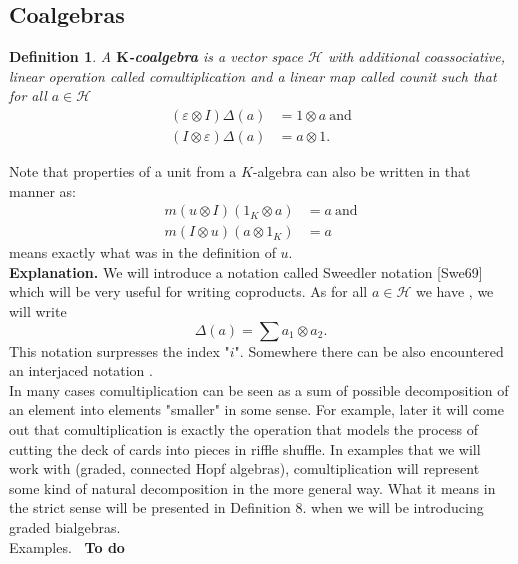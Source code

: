 \documentclass[a4paper, 12pt]{article}
\newtheorem{definition}{Definition}
\newcommand{\smalltodo}[1]{\textbf{\ To do}}
\begin{document}
\subsection{Coalgebras}
\begin{definition}
A \textbf{$\textbf{K}$-coalgebra} is a vector space $\mathcal{H}$
with additional coassociative, linear operation
 called comultiplication and
a linear map  called counit such that for all
$a \in \mathcal{H}$
\begin{align*}
(\varepsilon \otimes I)\Delta(a) &= 1 \otimes a \mathrm{\ and} \\
(I \otimes \varepsilon)\Delta(a) &= a \otimes 1.
\end{align*}
\end{definition}
Note that properties of a unit from a $K$-algebra can also be written in that manner as:
\begin{align*}
m(u \otimes I)(1_K \otimes a) &= a \mathrm{\ and}\\
m(I \otimes u)(a \otimes 1_K) &= a
\end{align*}
means exactly what was in the definition of $u$. \\[8pt]
\textbf{Explanation.} We will introduce a notation called Sweedler notation [Swe69] which will be
very useful
for writing coproducts. As for all $a \in \mathcal{H}$ we have
, we will write
\begin{equation*}
\Delta(a) = \displaystyle\sum a_1 \otimes a_2.
\end{equation*}
This notation surpresses the index "$i$". Somewhere there can be also encountered an interjaced
notation . \\
In many cases comultiplication can be seen as a sum of possible decomposition of an element into
elements "smaller" in some sense.
For example, later it will come out that comultiplication is exactly the operation that
models the process of cutting the deck of cards into pieces in riffle shuffle. In examples that we will
work with (graded, connected Hopf algebras), comultiplication will represent some kind of natural
decomposition in the more general way. What it means in the strict sense will be presented in
Definition 8. when we will be introducing graded bialgebras. \\
Examples. \smalltodo{}  \\[8pt]
\end{document}
